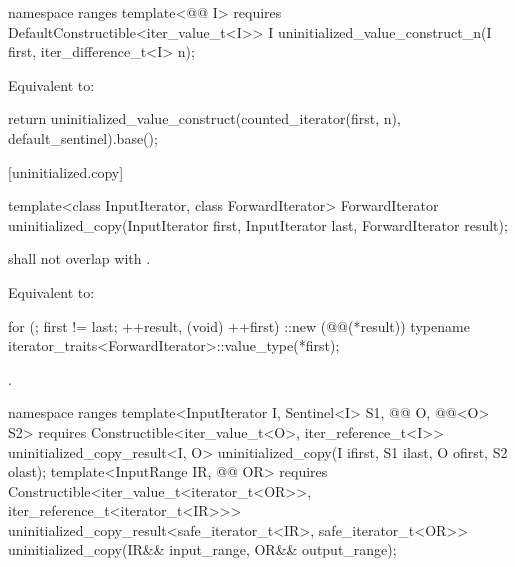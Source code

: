 %
\begin{itemdecl}
namespace ranges {
  template<@@ I>
      requires DefaultConstructible<iter_value_t<I>>
    I uninitialized_value_construct_n(I first, iter_difference_t<I> n);
}
\end{itemdecl}

\begin{itemdescr}
\pnum
\effects Equivalent to:
\begin{codeblock}
return uninitialized_value_construct(counted_iterator(first, n),
                                     default_sentinel).base();
\end{codeblock}
\end{itemdescr}

[uninitialized.copy]{}

%
\begin{itemdecl}
template<class InputIterator, class ForwardIterator>
  ForwardIterator uninitialized_copy(InputIterator first, InputIterator last,
                                     ForwardIterator result);
\end{itemdecl}

\begin{itemdescr}
\pnum
\expects
{} shall not overlap with .

\pnum
\effects
Equivalent to:
\begin{codeblock}
for (; first != last; ++result, (void) ++first)
  ::new (@@(*result))
    typename iterator_traits<ForwardIterator>::value_type(*first);
\end{codeblock}

\pnum
\returns
{}.
\end{itemdescr}

%
\begin{itemdecl}
namespace ranges {
  template<InputIterator I, Sentinel<I> S1,
           @@ O, @@<O> S2>
      requires Constructible<iter_value_t<O>, iter_reference_t<I>>
    uninitialized_copy_result<I, O>
      uninitialized_copy(I ifirst, S1 ilast, O ofirst, S2 olast);
  template<InputRange IR, @@ OR>
      requires Constructible<iter_value_t<iterator_t<OR>>, iter_reference_t<iterator_t<IR>>>
    uninitialized_copy_result<safe_iterator_t<IR>, safe_iterator_t<OR>>
      uninitialized_copy(IR&& input_range, OR&& output_range);
}
\end{itemdecl}

